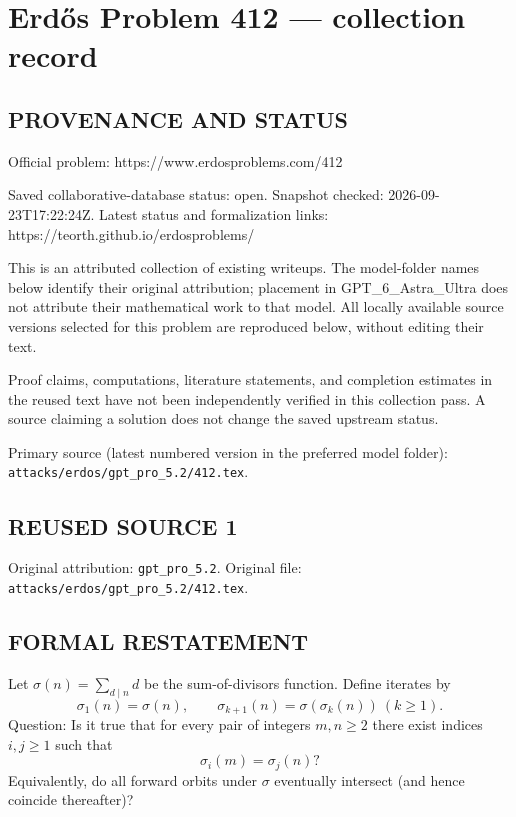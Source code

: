 \section*{Erd\H{o}s Problem 412 --- collection record}

\subsection*{PROVENANCE AND STATUS}
Official problem: https://www.erdosproblems.com/412

Saved collaborative-database status: open.
Snapshot checked: 2026-09-23T17:22:24Z.
Latest status and formalization links: https://teorth.github.io/erdosproblems/

This is an attributed collection of existing writeups. The model-folder names below identify their original attribution; placement in GPT\_6\_Astra\_Ultra does not attribute their mathematical work to that model. All locally available source versions selected for this problem are reproduced below, without editing their text.

Proof claims, computations, literature statements, and completion estimates in the reused text have not been independently verified in this collection pass. A source claiming a solution does not change the saved upstream status.

Primary source (latest numbered version in the preferred model folder): \texttt{attacks/erdos/gpt\_pro\_5.2/412.tex}.

\subsection*{REUSED SOURCE 1}
Original attribution: \texttt{gpt\_pro\_5.2}.
Original file: \texttt{attacks/erdos/gpt\_pro\_5.2/412.tex}.


\subsection*{FORMAL RESTATEMENT}
Let $\sigma(n)=\sum_{d\mid n} d$ be the sum-of-divisors function. Define iterates by
\[
  \sigma_1(n)=\sigma(n),\qquad \sigma_{k+1}(n)=\sigma(\sigma_k(n))\ (k\ge 1).
\]
Question: Is it true that for every pair of integers $m,n\ge2$ there exist indices $i,j\ge1$ such that
\[
  \sigma_i(m)=\sigma_j(n)?
\]
Equivalently, do all forward orbits under $\sigma$ eventually intersect (and hence coincide thereafter)?

